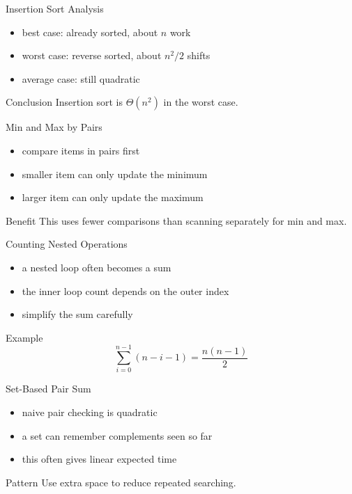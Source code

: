 \documentclass[aspectratio=169,xcolor=dvipsnames]{beamer}
\begin{document}
\begin{frame}{Insertion Sort Analysis}
  \begin{itemize}
    \item best case: already sorted, about $n$ work
    \item worst case: reverse sorted, about $n^2/2$ shifts
    \item average case: still quadratic
  \end{itemize}
  \begin{exampleblock}{Conclusion}
    Insertion sort is $\Theta(n^2)$ in the worst case.
  \end{exampleblock}
\end{frame}

\begin{frame}{Min and Max by Pairs}
  \begin{itemize}
    \item compare items in pairs first
    \item smaller item can only update the minimum
    \item larger item can only update the maximum
  \end{itemize}
  \begin{block}{Benefit}
    This uses fewer comparisons than scanning separately for min and max.
  \end{block}
\end{frame}

\begin{frame}{Counting Nested Operations}
  \begin{itemize}
    \item a nested loop often becomes a sum
    \item the inner loop count depends on the outer index
    \item simplify the sum carefully
  \end{itemize}
  \begin{exampleblock}{Example}
    \[
      \sum_{i=0}^{n-1}(n-i-1) = \frac{n(n-1)}{2}
    \]
  \end{exampleblock}
\end{frame}

\begin{frame}{Set-Based Pair Sum}
  \begin{itemize}
    \item naive pair checking is quadratic
    \item a set can remember complements seen so far
    \item this often gives linear expected time
  \end{itemize}
  \begin{block}{Pattern}
    Use extra space to reduce repeated searching.
  \end{block}
\end{frame}
\end{document}

